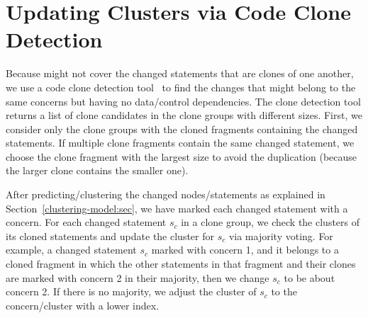 \section{Updating Clusters via Code Clone Detection}
\label{sec:clone}

Because {\mvpdg} might not cover the changed statements that are
clones of one another, we use a code clone detection
tool~\cite{svajlenko2017fast} to find the changes that might belong to
the same concerns but having no data/control dependencies. The clone
detection tool returns a list of clone candidates in the clone groups
with different sizes. First, we consider only the clone groups with
the cloned fragments containing the changed statements. If multiple
clone fragments contain the same changed statement, we choose the
clone fragment with the largest size to avoid the duplication (because
the larger clone contains the smaller one).

After predicting/clustering the changed nodes/statements as explained
in Section~\ref{clustering-model:sec}, we have marked each changed
statement with a concern. For each changed statement $s_c$ in a clone
group, we check the clusters of its cloned statements and update the
cluster for $s_c$ via majority voting. For example, a changed
statement $s_c$ marked with concern 1, and it belongs to a cloned
fragment in which the other statements in that fragment and their
clones are marked with concern 2 in their majority, then we change $s_c$
to be about concern 2. If there is no majority, we adjust the cluster
of $s_c$ to the concern/cluster with a lower index.



